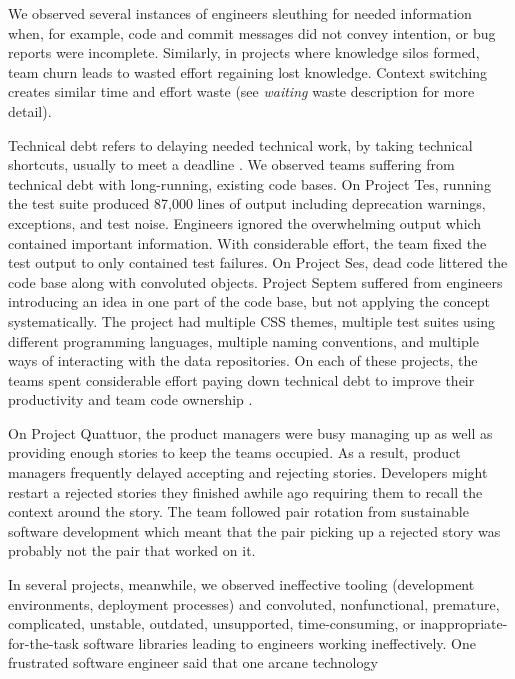 We observed several instances of engineers sleuthing for needed information when, for example, code and commit messages did not convey intention, or bug reports were incomplete. Similarly, in projects where knowledge silos formed, team churn leads to wasted effort regaining lost knowledge. Context switching creates similar time and effort waste (see \textit{waiting} waste description for more detail). 
 
Technical debt refers to delaying needed technical work, by taking technical shortcuts, usually to meet a deadline \cite{McConnellTechnicalDebt}. We observed teams suffering from technical debt with long-running, existing code bases. On Project Tes, running the test suite produced 87,000 lines of output including deprecation warnings, exceptions, and test noise. Engineers ignored the overwhelming output which contained important information. With considerable effort, the team fixed the test output to only contained test failures. On Project Ses, dead code littered the code base along with convoluted objects. Project Septem suffered from engineers introducing an idea in one part of the code base, but not applying the concept systematically. The project had multiple CSS themes, multiple test suites using different programming languages, multiple naming conventions, and multiple ways of interacting with the data repositories. On each of these projects, the teams spent considerable effort paying down technical debt to improve their productivity and team code ownership \cite{SedanoTeamCodeOwnership}.  

On Project Quattuor, the product managers were busy managing up as well as providing enough stories to keep the teams occupied. As a result, product managers frequently delayed accepting and rejecting stories. Developers might restart a rejected stories they finished awhile ago requiring them to recall the context around the story. The team followed pair rotation from sustainable software development \cite{SedanoSustainableSoftware} which meant that the pair picking up a rejected story was probably not the pair that worked on it.

In several projects, meanwhile, we observed ineffective tooling (development environments, deployment processes) and convoluted, nonfunctional, premature, complicated, unstable, outdated, unsupported, time-consuming, or inappropriate-for-the-task software libraries leading to engineers working ineffectively. One frustrated software engineer said that one arcane technology 

